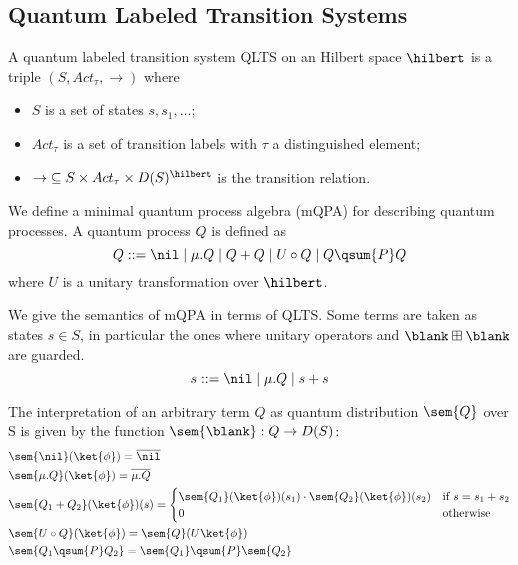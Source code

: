 \subsection{Quantum Labeled Transition Systems}

A quantum labeled transition system QLTS on an Hilbert space $\hilbert$ is a triple $(S, Act_\tau, \rightarrow)$ where
\begin{itemize}
	\item $S$ is a set of states $s, s_1, \dots$;
	\item $Act_\tau$ is a set of transition labels with $\tau$ a distinguished element;
	\item $\rightarrow\;\subseteq S \times Act_\tau \times D(S)^\hilbert$ is the transition relation. 
\end{itemize}

We define a minimal quantum process algebra (mQPA) for describing quantum processes.
A quantum process $Q$ is defined as
\[
Q ::= \nil \mid \mu.Q \mid Q + Q \mid U \circ Q \mid Q \qsum{P} Q
\]
where $U$ is a unitary transformation over $\hilbert$.

We give the semantics of mQPA in terms of QLTS.
Some terms are taken as states $s \in S$, in particular the ones where unitary operators and $\blank \boxplus \blank$ are guarded.
\[
s ::= \nil \mid \mu.Q \mid s + s
\]

The interpretation of an arbitrary term $Q$ as quantum distribution $\sem{Q}$ over S is given by the function $\sem{\blank} : Q \to D(S)$:
\begin{align*}
	&\sem{\nil}(\ket{\phi}) = \overline{\nil}\\
	&\sem{\mu.Q}(\ket{\phi}) = \overline{\mu.Q}\\
	&\sem{Q_1 + Q_2}(\ket{\phi})(s) = 
	\begin{cases}
		\sem{Q_1}(\ket{\phi})(s_1) \cdot \sem{Q_2}(\ket{\phi})(s_2) & \text{if } s = s_1 + s_2\\
		0 & \text{otherwise}
	\end{cases}\\
	&\sem{U \circ Q}(\ket{\phi}) = \sem{Q}(U \ket{\phi})\\
	&\sem{Q_1 \qsum{P} Q_2} = \sem{Q_1} \qsum{P} \sem{Q_2}
\end{align*}

